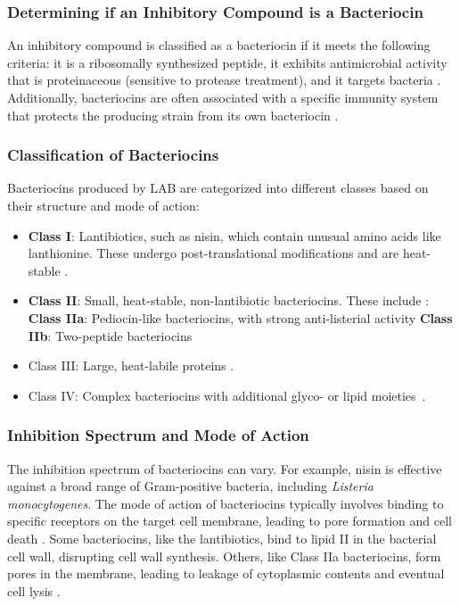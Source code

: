\subsubsection*{Determining if an Inhibitory Compound is a Bacteriocin}
An inhibitory compound is classified as a bacteriocin if it meets the following criteria: it is a ribosomally synthesized peptide, it exhibits antimicrobial activity that is proteinaceous (sensitive to protease treatment), and it targets bacteria \cite*{L3-LAB}. Additionally, bacteriocins are often associated with a specific immunity system that protects the producing strain from its own bacteriocin \cite*{L3-LAB}.

\subsubsection*{Classification of Bacteriocins}
Bacteriocins produced by LAB are categorized into different classes based on their structure and mode of action:
\begin{itemize}
    \item \textbf{Class I}: Lantibiotics, such as nisin, which contain unusual amino acids like lanthionine. These undergo post-translational modifications and are heat-stable \cite*{L3-LAB}.
    \item \textbf{Class II}: Small, heat-stable, non-lantibiotic bacteriocins. These include \cite*{L3-LAB}:
    \subitem \textbf{Class IIa}: Pediocin-like bacteriocins, with strong anti-listerial activity
    \subitem \textbf{Class IIb}: Two-peptide bacteriocins
    \item Class III: Large, heat-labile proteins \cite*{L8-MicroInFood}.
    \item Class IV: Complex bacteriocins with additional glyco- or lipid moieties \cite*{L8-MicroInFood}.
\end{itemize}

\subsubsection*{Inhibition Spectrum and Mode of Action}
The inhibition spectrum of bacteriocins can vary. For example, nisin is effective against a broad range of Gram-positive bacteria, including \textit{Listeria monocytogenes}. The mode of action of bacteriocins typically involves binding to specific receptors on the target cell membrane, leading to pore formation and cell death \cite*{L3-LAB}. Some bacteriocins, like the lantibiotics, bind to lipid II in the bacterial cell wall, disrupting cell wall synthesis. Others, like Class IIa bacteriocins, form pores in the membrane, leading to leakage of cytoplasmic contents and eventual cell lysis \cite*{L3-LAB}.






